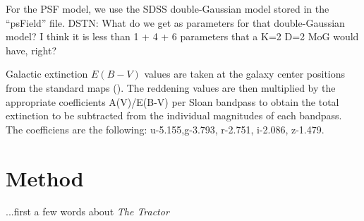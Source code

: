 \documentclass[12pt,preprint,pdftex]{aastex}
\newcommand{\project}[1]{\textsl{#1}}
\begin{document}
For the PSF model, we use the SDSS double-Gaussian model stored in the
``psField'' file.  DSTN: What do we get as parameters for that
double-Gaussian model?  I think it is less than 1 + 4 + 6 parameters
that a K=2 D=2 MoG would have, right?

Galactic extinction $E(B-V)$ values are taken at the galaxy center
positions from the standard maps (\citealt{schlegel98}).  The
reddening values are then multiplied by the appropriate coefficients
A(V)/E(B-V) per Sloan bandpass to obtain the total extinction to be
subtracted from the individual magnitudes of each bandpass. The
coefficiens are the following: u-5.155,g-3.793, r-2.751, i-2.086,
z-1.479.


\section{Method}\label{sec:method}

...first a few words about \project{The Tractor}
\end{document}
